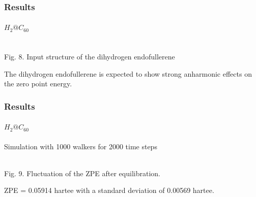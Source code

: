 \documentclass{beamer}
\begin{document}
\begin{frame}
\frametitle{Results}
\framesubtitle{$H_2@C_{60}$}
\begin{center}
\\
Fig. 8. Input structure of the dihydrogen endofullerene
\end{center}
The dihydrogen endofullerene is expected to show strong anharmonic effects on the zero point energy.\\
\end{frame}

\begin{frame}
\frametitle{Results}
\framesubtitle{$H_2@C_{60}$}
Simulation with 1000 walkers for 2000 time steps
\begin{center}
\\
Fig. 9. Fluctuation of the ZPE after equilibration.
\end{center}
ZPE = 0.05914 hartee with a standard deviation of 0.00569 hartee.\\

\end{frame}
\end{document}
